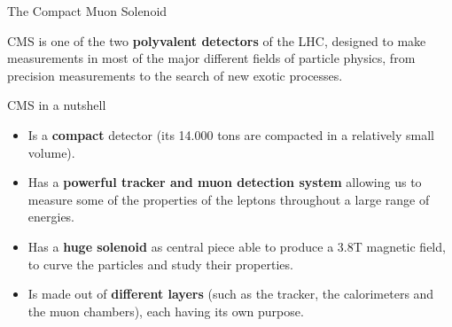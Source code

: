 \documentclass[handout,8 pt]{beamer}
\begin{document}
\begin{frame}{The Compact Muon Solenoid}
	\begin{minipage}[c]{.49\linewidth}
	\justifying
	CMS is one of the two \textbf{polyvalent detectors} of the LHC, designed to make measurements in most of the major different fields of particle physics, from precision measurements to the search of new exotic processes. \\ \vspace{10pt}
	 \vfill
   	\end{minipage} \hfill
   	\begin{minipage}[c]{.42\linewidth}
		\begin{block}{\vspace{5pt} CMS in a nutshell}
	\begin{itemize}
	\justifying
	\vspace{5pt}
	\item Is a \textbf{compact} detector (its 14.000 tons are compacted in a relatively small volume). \\ \vspace{3pt}
	\item Has a \textbf{powerful tracker and muon detection system} allowing us to measure some of the properties of the leptons throughout a large range of energies. \\ \vspace{3pt}
	\item Has a \textbf{huge solenoid} as central piece able to produce a 3.8T magnetic field, to curve the particles and study their properties. \\ \vspace{3pt}
	\item Is made out of \textbf{different layers} (such as the tracker, the calorimeters and the muon chambers), each having its own purpose. \\ \vspace{5pt}
	\end{itemize}
	\end{block}
   	\end{minipage} \hfill \vfill	
\end{frame}
\end{document}
